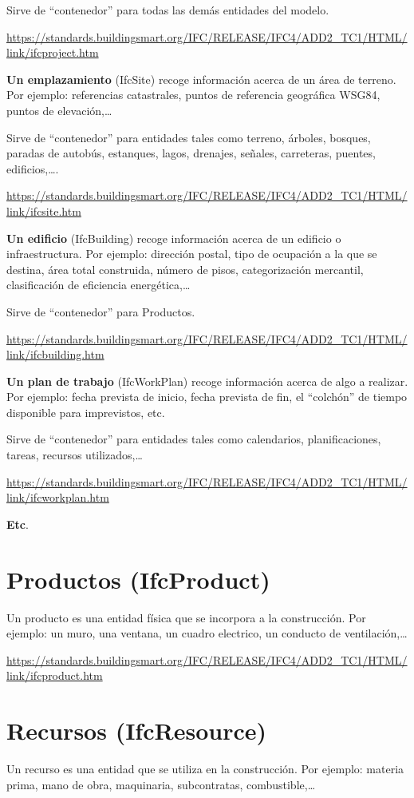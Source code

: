 \documentclass[spanish,12pt,a4paper,final,oneside]{book}
\begin{document}
Sirve de ``contenedor'' para todas las demás entidades del modelo.

\url{https://standards.buildingsmart.org/IFC/RELEASE/IFC4/ADD2_TC1/HTML/link/ifcproject.htm}

\textbf{Un emplazamiento} (IfcSite) recoge información acerca de un área de terreno. Por ejemplo: referencias catastrales, puntos de referencia geográfica WSG84, puntos de elevación,\ldots

Sirve de ``contenedor'' para entidades tales como terreno, árboles, bosques, paradas de autobús, estanques, lagos, drenajes, señales, carreteras, puentes, edificios,\ldots. 

\url{https://standards.buildingsmart.org/IFC/RELEASE/IFC4/ADD2_TC1/HTML/link/ifcsite.htm}

\textbf{Un edificio} (IfcBuilding) recoge información acerca de un edificio o infraestructura. Por ejemplo: dirección postal, tipo de ocupación a la que se destina, área total construida, número de pisos, categorización mercantil, clasificación de eficiencia energética,\ldots

Sirve de ``contenedor'' para Productos.

\url{https://standards.buildingsmart.org/IFC/RELEASE/IFC4/ADD2_TC1/HTML/link/ifcbuilding.htm}

\textbf{Un plan de trabajo} (IfcWorkPlan) recoge información acerca de algo a realizar. Por ejemplo:  fecha prevista de inicio, fecha prevista de fin, el ``colchón'' de tiempo disponible para imprevistos, etc.   

Sirve de ``contenedor'' para entidades tales como calendarios, planificaciones, tareas, recursos utilizados,\ldots 

\url{https://standards.buildingsmart.org/IFC/RELEASE/IFC4/ADD2_TC1/HTML/link/ifcworkplan.htm}

\textbf{Etc}.

\section{Productos (IfcProduct)}
Un producto es una entidad física que se incorpora a la construcción. Por ejemplo: un muro, una ventana, un cuadro electrico, un conducto de ventilación,\ldots

\url{https://standards.buildingsmart.org/IFC/RELEASE/IFC4/ADD2_TC1/HTML/link/ifcproduct.htm}


\section{Recursos (IfcResource)}
Un recurso es una entidad que se utiliza en la construcción. Por ejemplo: materia prima, mano de obra, maquinaria, subcontratas, combustible,\ldots 
\end{document}
